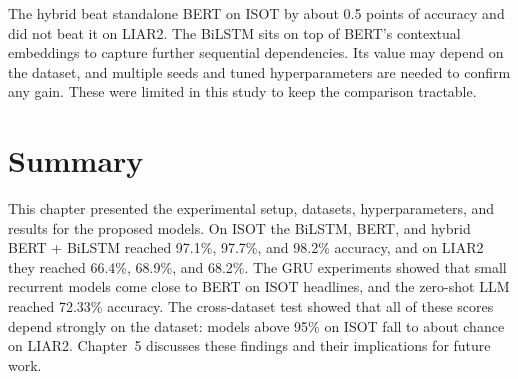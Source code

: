 The hybrid beat standalone BERT on ISOT by about 0.5 points of accuracy and did not beat it on LIAR2. The BiLSTM sits on top of BERT's contextual embeddings to capture further sequential dependencies. Its value may depend on the dataset, and multiple seeds and tuned hyperparameters are needed to confirm any gain. These were limited in this study to keep the comparison tractable.

\section{Summary}

This chapter presented the experimental setup, datasets, hyperparameters, and results for the proposed models. On ISOT the BiLSTM, BERT, and hybrid BERT + BiLSTM reached 97.1\%, 97.7\%, and 98.2\% accuracy, and on LIAR2 they reached 66.4\%, 68.9\%, and 68.2\%. The GRU experiments showed that small recurrent models come close to BERT on ISOT headlines, and the zero-shot LLM reached 72.33\% accuracy. The cross-dataset test showed that all of these scores depend strongly on the dataset: models above 95\% on ISOT fall to about chance on LIAR2. Chapter~5 discusses these findings and their implications for future work.

